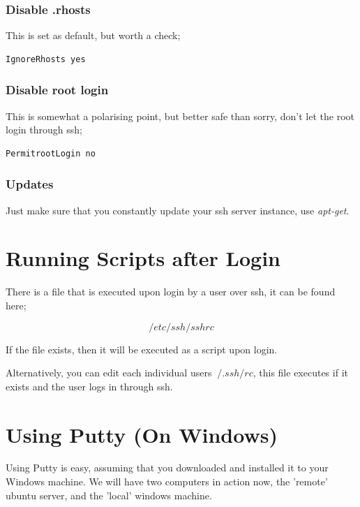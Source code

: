 \subsubsection{Disable .rhosts}

This is set as default, but worth a check;

\begin{verbatim}
IgnoreRhosts yes
\end{verbatim}

\subsubsection{Disable root login}

This is somewhat a polarising point, but better safe than sorry, don't let the root login through ssh;

\begin{verbatim}
PermitrootLogin no
\end{verbatim}

\subsubsection{Updates}

Just make sure that you constantly update your ssh server instance, use \textit{apt-get}.


\section{Running Scripts after Login}

There is a file that is executed upon login by a user over ssh, it can be found here;

$$/etc/ssh/sshrc$$

If the file exists, then it will be executed as a script upon login.

Alternatively, you can edit each individual users $~/.ssh/rc$, this file executes if it exists and the user logs in through ssh.


\section{Using Putty (On Windows)}
\label{sec:putty}

Using Putty is easy, assuming that you downloaded and installed it to your Windows machine.  We will have two computers in action now, the 'remote' ubuntu server, and the 'local' windows machine.

